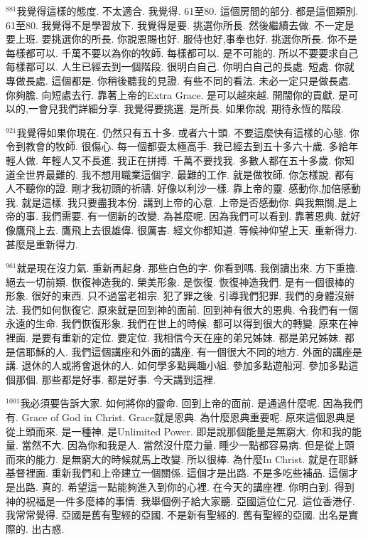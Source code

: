 \documentclass{book}
\begin{document}
$^{881}$我覺得這樣的態度.
不太適合.
我覺得.
61至80.
這個房間的部分.
都是這個類別.
61至80.
我覺得不是學習放下.
我覺得是要.
挑選你所長.
然後繼續去做.
不一定是要上班.
要挑選你的所長.
你說恩賜也好.
服侍也好,事奉也好.
挑選你所長.
你不是每樣都可以.
千萬不要以為你的牧師.
每樣都可以.
是不可能的.
所以不要要求自己每樣都可以.
人生已經去到一個階段.
很明白自己.
你明白自己的長處.
短處.
你就專做長處.
這個都是.
你稍後聽我的見證.
有些不同的看法.
未必一定只是做長處.
你夠膽.
向短處去行.
靠著上帝的Extra Grace.
是可以越來越.
開闊你的貢獻.
是可以的,一會兒我們詳細分享.
我覺得要挑選.
是所長.
如果你說.
期待永恆的階段.

$^{921}$我覺得如果你現在.
仍然只有五十多.
或者六十頭.
不要這麼快有這樣的心態.
你令到教會的牧師.
很傷心.
每一個都耍太極高手.
我已經去到五十多六十歲.
多給年輕人做.
年輕人又不長進.
我正在拼搏.
千萬不要找我.
多數人都在五十多歲.
你知道全世界最難的.
我不想用職業這個字.
最難的工作.
就是做牧師.
你怎樣說.
都有人不聽你的證.
剛才我初頭的祈禱.
好像以利沙一樣.
靠上帝的靈.
感動你,加倍感動我.
就是這樣.
我只要盡我本份.
講到上帝的心意.
上帝是否感動你.
與我無關,是上帝的事.
我們需要.
有一個新的改變.
為甚麼呢.
因為我們可以看到.
靠著恩典.
就好像鷹飛上去.
鷹飛上去很雄偉.
很厲害.
經文你都知道.
等候神仰望上天.
重新得力.
甚麼是重新得力.

$^{961}$就是現在沒力氣.
重新再起身.
那些白色的字.
你看到嗎.
我倒讀出來.
方下重擔.
絕去一切前類.
恢復神造我的.
榮美形象.
是恢復.
恢復神造我們.
是有一個很棒的形象.
很好的東西.
只不過當老祖宗.
犯了罪之後.
引導我們犯罪.
我們的身體沒辦法.
我們如何恢復它.
原來就是回到神的面前.
回到神有很大的恩典.
令我們有一個永遠的生命.
我們恢復形象.
我們在世上的時候.
都可以得到很大的轉變.
原來在神裡面.
是要有重新的定位.
要定位.
我相信今天在座的弟兄姊妹.
都是弟兄姊妹.
都是信耶穌的人.
我們這個講座和外面的講座.
有一個很大不同的地方.
外面的講座是講.
退休的人或將會退休的人.
如何學多點興趣小組.
參加多點遊船河.
參加多點這個那個.
那些都是好事.
都是好事.
今天講到這裡.

$^{1001}$我必須要告訴大家.
如何將你的靈命.
回到上帝的面前.
是通過什麼呢.
因為我們有.
Grace of God in Christ.
Grace就是恩典.
為什麼恩典重要呢.
原來這個恩典是從上頭而來.
是一種神.
是Unlimited Power.
即是說那個能量是無窮大.
你和我的能量.
當然不大.
因為你和我是人.
當然沒什麼力量.
睡少一點都容易病.
但是從上頭而來的能力.
是無窮大的時候就馬上改變.
所以很棒.
為什麼In Christ.
就是在耶穌基督裡面.
重新我們和上帝建立一個關係.
這個才是出路.
不是多吃些補品.
這個才是出路.
真的.
希望這一點能夠進入到你的心裡.
在今天的講座裡.
你明白到.
得到神的祝福是一件多麼棒的事情.
我舉個例子給大家聽.
亞國這位仁兄.
這位香港仔.
我常常覺得.
亞國是舊有聖經的亞國.
不是新有聖經的.
舊有聖經的亞國.
出名是實際的.
出古惑.
\end{document}

